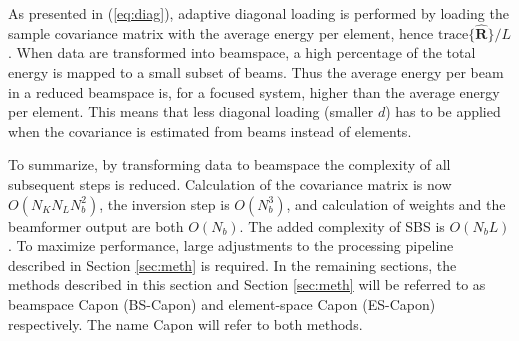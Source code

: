 \documentclass[journal]{IEEEtran}
\newcommand{\mat}[1]{\mathbf{#1}}
\renewcommand{\vec}[1]{\mathbf{#1}}
\begin{document}
As presented in (\ref{eq:diag}), adaptive diagonal loading is performed by loading the sample covariance matrix with the average energy per element, hence $\text{trace}\{\mat{\hat{R}}\}/L$. When data are transformed into beamspace, a high percentage of the total energy is mapped to a small subset of beams. Thus the average energy per beam in a reduced beamspace is, for a focused system, higher than the average energy per element. This means that less diagonal loading (smaller $d$) has to be applied when the covariance is estimated from beams instead of elements. 

To summarize, by transforming data to beamspace the complexity of all subsequent steps is reduced. Calculation of the covariance matrix is now $O(N_KN_LN_b^2)$, the inversion step is $O(N_b^3)$, and calculation of weights and the beamformer output are both $O(N_b)$. The added complexity of SBS is $O(N_bL)$. To maximize performance, large adjustments to the processing pipeline described in Section \ref{sec:meth} is required. In the remaining sections, the methods described in this section and Section \ref{sec:meth} will be referred to as beamspace Capon (BS-Capon) and element-space Capon (ES-Capon) respectively. The name Capon will refer to both methods.  





 
\end{document}
